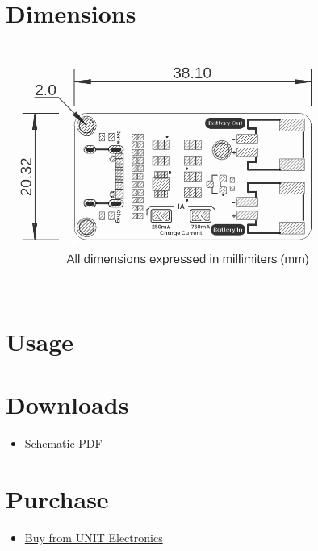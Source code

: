 \documentclass[10pt]{article}
\begin{document}
\section*{Dimensions}
\vspace{1em}
\begin{center}
\includegraphics[width=0.85\textwidth,keepaspectratio]{images/dimensions.png}
\end{center}



\section*{Usage}


\section*{Downloads}

\begin{itemize}
\item \href{../../hardware/unit_sch_v_0_0_1_ue0089_cn3165_battery_charger.pdf}{Schematic PDF}
\end{itemize}


\section*{Purchase}
\begin{itemize}
\item \href{https://www.uelectronics.com}{Buy from UNIT Electronics}
\end{itemize}
\end{document}
